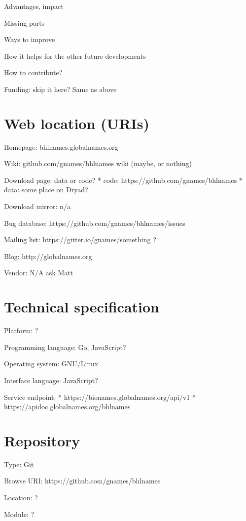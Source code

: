 \documentclass[
]{article}
\begin{document}
Advantages, impact

Missing parts

Ways to improve

How it helps for the other future developments

How to contribute?

Funding: skip it here? Same as above

\hypertarget{web-location-uris}{%
\section{Web location (URIs)}\label{web-location-uris}}

Homepage: bhlnames.globalnames.org

Wiki: github.com/gnames/bhlnames wiki (maybe, or nothing)

Download page: data or code? * code: https://github.com/gnames/bhlnames
* data: some place on Dryad?

Download mirror: n/a

Bug database: https://github.com/gnames/bhlnames/issues

Mailing list: https://gitter.io/gnames/something ?

Blog: http://globalnames.org

Vendor: N/A ask Matt

\hypertarget{technical-specification}{%
\section{Technical specification}\label{technical-specification}}

Platform: ?

Programming language: Go, JavaScript?

Operating system: GNU/Linux

Interface language: JavaScript?

Service endpoint: * https://bionames.globalnames.org/api/v1 *
https://apidoc.globalnames.org/bhlnames

\hypertarget{repository}{%
\section{Repository}\label{repository}}

Type: Git

Browse URI: https://github.com/gnames/bhlnames

Location: ?

Module: ?
\end{document}
